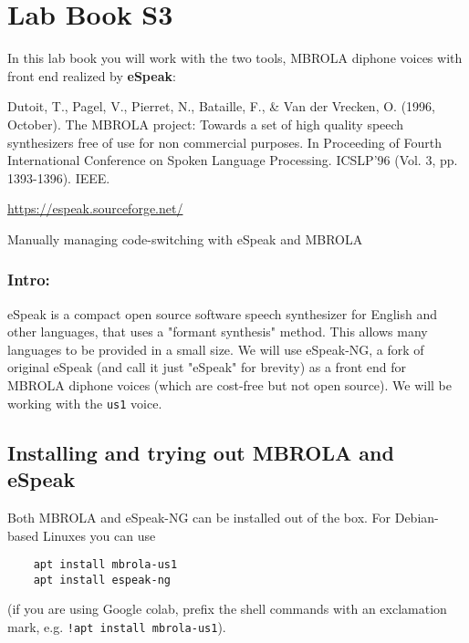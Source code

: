 \documentclass{../labbook}
\begin{document}
\section{Lab Book S3}
\noindent In this lab book you will work with the two tools, {MBROLA} diphone voices with front end realized by \textbf{eSpeak}:

\noindent Dutoit, T., Pagel, V., Pierret, N., Bataille, F., \& Van der Vrecken, O. (1996, October). The MBROLA project: Towards a set of high quality speech synthesizers free of use for non commercial purposes. In Proceeding of Fourth International Conference on Spoken Language Processing. ICSLP'96 (Vol. 3, pp. 1393-1396). IEEE.

\noindent \href{https://espeak.sourceforge.net/}{https://espeak.sourceforge.net/}


\begin{problem}{2}{10}{Manually managing code-switching with eSpeak and MBROLA}
\subsubsection*{Intro:}
eSpeak is a compact open source software speech synthesizer for English and other languages, that uses a "formant synthesis" method. This allows many languages to be provided in a small size. 
We will use eSpeak-NG, a fork of original eSpeak (and call it just "eSpeak" for brevity) as a front end for MBROLA diphone voices (which are cost-free but not open source). We will be working with the \texttt{us1} voice.

\subsection*{Installing and trying out MBROLA and eSpeak}
Both MBROLA and eSpeak-NG can be installed out of the box. For Debian-based Linuxes you can use 
\begin{verbatim} 
    apt install mbrola-us1
    apt install espeak-ng
\end{verbatim} (if you are using Google colab, prefix the shell commands with an exclamation mark, e.g. 
\texttt{!apt install mbrola-us1}).
\smallskip


\end{problem}
\end{document}
